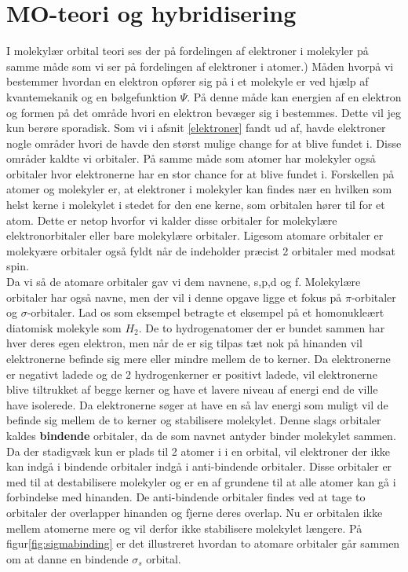 \section{MO-teori og hybridisering}
I molekylær orbital teori ses der på fordelingen af elektroner i molekyler på samme måde som vi ser på fordelingen af elektroner i atomer.) Måden hvorpå vi bestemmer hvordan en elektron opfører sig på i et molekyle er ved hjælp af kvantemekanik og en bølgefunktion $\Psi$. På denne måde kan energien af en elektron og formen på det område hvori en elektron bevæger sig i bestemmes. Dette vil jeg kun berøre sporadisk. Som vi i afsnit \ref{elektroner} fandt ud af, havde elektroner nogle områder hvori de havde den størst mulige change for at blive fundet i. Disse områder kaldte vi orbitaler. På samme måde som atomer har molekyler også orbitaler hvor elektronerne har en stor chance for at blive fundet i. Forskellen på atomer og molekyler er, at elektroner i molekyler kan findes nær en hvilken som helst kerne i molekylet i stedet for den ene kerne, som orbitalen hører til for et atom. Dette er netop hvorfor vi kalder disse orbitaler for molekylære elektronorbitaler eller bare molekylære orbitaler. Ligesom atomare orbitaler er molekyære orbitaler også fyldt når de indeholder præcist 2 orbitaler med modsat spin. 
\\

Da vi så de atomare orbitaler gav vi dem navnene, s,p,d og f. Molekylære orbitaler har også navne, men der vil i denne opgave ligge et fokus på $\pi$-orbitaler og $\sigma$-orbitaler. Lad os som eksempel betragte et eksempel på et homonukleært diatomisk molekyle som $H_2$. De to hydrogenatomer der er bundet sammen har hver deres egen elektron, men når de er sig tilpas tæt nok på hinanden vil elektronerne befinde sig mere eller mindre mellem de to kerner. Da elektronerne er negativt ladede og de 2 hydrogenkerner er positivt ladede, vil elektronerne blive tiltrukket af begge kerner og have et lavere niveau af energi end de ville have isolerede. Da elektronerne søger at have en så lav energi som muligt vil de befinde sig mellem de to kerner og stabilisere molekylet. Denne slags orbitaler kaldes \textbf{bindende} orbitaler, da de som navnet antyder binder molekylet sammen. Da der stadigvæk kun er plads til 2 atomer i i en orbital, vil elektroner der ikke kan indgå i bindende orbitaler indgå i anti-bindende orbitaler. Disse orbitaler er med til at destabilisere molekyler og er en af grundene til at alle atomer kan gå i forbindelse med hinanden. De anti-bindende orbitaler findes ved at tage to orbitaler der overlapper hinanden og fjerne deres overlap. Nu er orbitalen ikke mellem atomerne mere og vil derfor ikke stabilisere molekylet længere. På figur\ref{fig:sigmabinding} er det illustreret hvordan to atomare orbitaler går sammen om at danne en bindende $\sigma_s$ orbital. 

